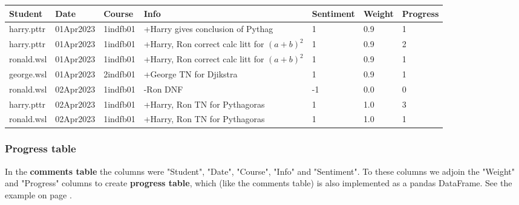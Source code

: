\documentclass[10pt]{article}
\begin{document}
\begin{landscape}
\begin{tcolorbox}[title = comments\_table\_DataFrame $\subset$ progress\_table\_DataFrame]
\begin{tabular}{|l|l|l|l|l||l|l|}
\hline
\textbf{Student} & \textbf{Date} & \textbf{Course} & \textbf{Info}                                                               & \textbf{Sentiment} & \textbf{Weight} & \textbf{Progress} \\ \hline
harry.pttr       & 01Apr2023     & 1indfb01        & +Harry gives conclusion of Pythag                                           & 1                  & 0.9             & 1                 \\ \hline
harry.pttr       & 01Apr2023     & 1indfb01        & +Harry, Ron correct calc litt for $(a+b)^2$ & 1                  & 0.9             & 2                 \\ \hline
ronald.wsl       & 01Apr2023     & 1indfb01        & +Harry, Ron correct calc litt for $(a+b)^2$ & 1                  & 0.9             & 1                 \\ \hline
george.wsl       & 01Apr2023     & 2indfb01        & +George TN for Djikstra                                                     & 1                  & 0.9             & 1                 \\ \hline
ronald.wsl       & 02Apr2023     & 1indfb01        & -Ron DNF                                                                    & -1                 & 0.0             & 0                 \\ \hline
harry.pttr       & 02Apr2023     & 1indfb01        & +Harry, Ron TN for Pythagoras                                                & 1                  & 1.0             & 3                 \\ \hline
ronald.wsl       & 02Apr2023     & 1indfb01        & +Harry, Ron TN for Pythagoras                                                & 1                  & 1.0             & 1                 \\ \hline
\end{tabular}
\end{tcolorbox}

\end{landscape}

\subsubsection{Progress table}
In the \textbf{comments table} the columns were "Student", "Date", "Course", "Info" and "Sentiment". To these columns we adjoin the "Weight" and "Progress" columns to create \textbf{progress table}, which (like the comments table) is also implemented as a pandas DataFrame. See the example on page \pageref{comments_table}.
\end{document}
